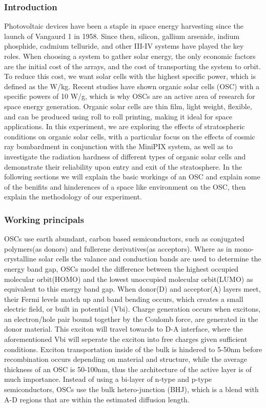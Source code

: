 \subsubsection{Introduction}
Photovoltaic devices have been a staple in space energy harvesting since the launch of Vangaurd 1 in 1958. Since then, silicon, gallium arsenide, indium phosphide, cadmium telluride, and other III-IV systems have played the key roles. When choosing a system to gather solar energy, the only economic factors are the initial cost of the arrays, and the cost of transporting the system to orbit. To reduce this cost, we want solar cells with the highest specific power, which is defined as the W/kg. Recent studies have shown organic solar cells (OSC) with a specific powers of 10 W/g, which is why OSCs are an active area of research for space energy generation. Organic solar cells are thin film, light weight, flexible, and can be produced using roll to roll printing, making it ideal for space applications. In this experiment, we are exploring the effects of stratospheric conditions on organic solar cells, with a particular focus on the effects of cosmic ray bombardment in conjunction with the MiniPIX system, as well as to investigate the radiation hardness of different types of organic solar cells and demonstrate their reliability upon entry and exit of the stratosphere. In the following sections we will explain the basic workings of an OSC and explain some of the benifits and hinderences of a space like environment on the OSC, then explain the methodology of our experiment.\cite{Space organic cells}

\subsubsection{Working principals}
OSCs use earth abundant, carbon based semiconductors, such as conjugated polymers(as donors) and fullerene derivatives(as acceptors). Where as in mono-crystalline solar cells the valance and conduction bands are used to determine the energy band gap, OSCs model the difference between the highest occupied molecular orbit(HOMO) and the lowest unoccupied molecular orbit(LUMO) as equivalent to this energy band gap. When donor(D) and acceptor(A) layers meet, their Fermi levels match up and band bending occurs, which creates a small electric field, or built in potential (Vbi). Charge generation occurs when excitons, an electron/hole pair bound together by the Coulomb force, are generated in the donor material. This exciton will travel towards to D-A interface, where the aforementioned Vbi will seperate the exciton into free charges given sufficient conditions.  Exciton transportation inside of the bulk is hindered to 5-50nm before recombination occurs depending on material and structure, while the average thickness of an OSC is 50-100nm, thus the architecture of the active layer is of much importance. Instead of using a bi-layer of n-type and p-type semiconductors, OSCs use the bulk hetero-junction (BHJ), which is a blend with A-D regions that are within the estimated diffusion length.  
	
